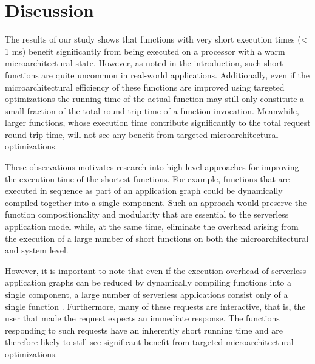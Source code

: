 \section{Discussion}
\label{sec:discussion}


The results of our study shows that functions with very short execution times (< 1 ms) benefit significantly from being executed on a processor with a warm microarchitectural state. However, as noted in the introduction, such short functions are quite uncommon in real-world applications. Additionally, even if the microarchitectural efficiency of these functions are improved using targeted optimizations the running time of the actual function may still only constitute a small fraction of the total round trip time of a function invocation. Meanwhile, larger functions, whose execution time contribute significantly to the total request round trip time, will not see any benefit from targeted microarchitectural optimizations.

These observations motivates research into high-level approaches for improving the execution time of the shortest functions. For example, functions that are executed in sequence as part of an application graph could be dynamically compiled together into a single component. Such an approach would preserve the function compositionality and modularity that are essential to the serverless application model while, at the same time, eliminate the overhead arising from the execution of a large number of short functions on both the microarchitectural and system level.

However, it is important to note that even if the execution overhead of serverless application graphs can be reduced by dynamically compiling functions into a single component, a large number of serverless applications consist only of a single function \cite{serverless_state}. Furthermore, many of these requests are interactive, that is, the user that made the request expects an immediate response. The functions responding to such requests have an inherently short running time and are therefore likely to still see significant benefit from targeted microarchitectural optimizations.


